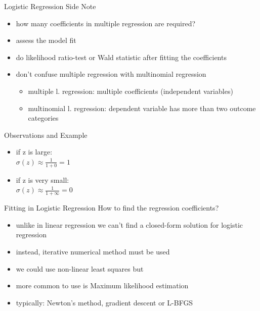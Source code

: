 \documentclass{beamer}
\begin{document}
\begin{frame}{Logistic Regression Side Note}
\begin{itemize}
\item how many coefficients in multiple regression are required? 
\item assess the model fit
\item do likelihood ratio-test or Wald statistic after fitting the coefficients
\item don't confuse multiple regression with multinomial regression
  \begin{itemize}
  \item multiple l. regression: multiple coefficients (independent variables)
  \item multinomial l. regression: dependent variable has more than two outcome categories
  \end{itemize}
\end{itemize}

\end{frame}


\begin{frame}{Observations and Example}
\begin{itemize}
\item if z is large:\\
$\sigma(z)\approx\frac{1}{1+0}=1$
\item if z is very small:\\
$\sigma(z)\approx\frac{1}{1+\infty}=0$
\end{itemize}

\end{frame}

\begin{frame}{Fitting in Logistic Regression}
How to find the regression coefficients?
\begin{itemize}
\item unlike in linear regression we can't find a closed-form solution for logistic regression
\item instead, iterative numerical method must be used
\item we could use non-linear least squares but
\item more common to use is Maximum likelihood estimation
\item typically: Newton's method, gradient descent or L-BFGS
\end{itemize}
\end{frame}
\end{document}
